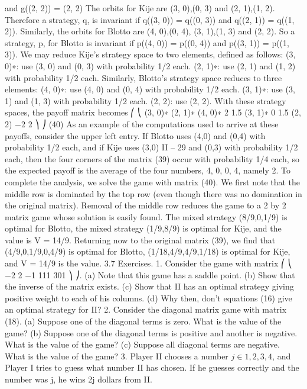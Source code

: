 \documentclass[]{report}
\begin{document}
and g((2, 2)) = (2, 2)
The orbits for Kije are {(3, 0),(0, 3)} and {(2, 1),(1, 2)}. Therefore a strategy, q, is
invariant if q((3, 0)) = q((0, 3)) and q((2, 1)) = q((1, 2)). Similarly, the orbits for Blotto
are {(4, 0),(0, 4)}, {(3, 1),(1, 3)} and {(2, 2)}. So a strategy, p, for Blotto is invariant if
p((4, 0)) = p((0, 4)) and p((3, 1)) = p((1, 3)).
We may reduce Kije’s strategy space to two elements, defined as follows:
(3, 0)∗: use (3, 0) and (0, 3) with probability 1/2 each.
(2, 1)∗: use (2, 1) and (1, 2) with probability 1/2 each.
Similarly, Blotto’s strategy space reduces to three elements:
(4, 0)∗: use (4, 0) and (0, 4) with probability 1/2 each.
(3, 1)∗: use (3, 1) and (1, 3) with probability 1/2 each.
(2, 2): use (2, 2).
With these strategy spaces, the payoff matrix becomes
⎛
⎝
(3, 0)∗ (2, 1)∗
(4, 0)∗ 2 1.5
(3, 1)∗ 0 1.5
(2, 2) −2 2
⎞
⎠ (40)
As an example of the computations used to arrive at these payoffs, consider the upper
left entry. If Blotto uses (4,0) and (0,4) with probability 1/2 each, and if Kije uses (3,0)
II – 29
and (0,3) with probability 1/2 each, then the four corners of the matrix (39) occur with
probability 1/4 each, so the expected payoff is the average of the four numbers, 4, 0, 0, 4,
namely 2.
To complete the analysis, we solve the game with matrix (40). We first note that
the middle row is dominated by the top row (even though there was no domination in the
original matrix). Removal of the middle row reduces the game to a 2 by 2 matrix game
whose solution is easily found. The mixed strategy (8/9,0,1/9) is optimal for Blotto, the
mixed strategy (1/9,8/9) is optimal for Kije, and the value is V = 14/9.
Returning now to the original matrix (39), we find that (4/9,0,1/9,0,4/9) is optimal
for Blotto, (1/18,4/9,4/9,1/18) is optimal for Kije, and V = 14/9 is the value.
3.7 Exercises.
1. Consider the game with matrix
⎛
⎝
−2 2 −1
111
301
⎞
⎠.
(a) Note that this game has a saddle point.
(b) Show that the inverse of the matrix exists.
(c) Show that II has an optimal strategy giving positive weight to each of his columns.
(d) Why then, don’t equations (16) give an optimal strategy for II?
2. Consider the diagonal matrix game with matrix (18).
(a) Suppose one of the diagonal terms is zero. What is the value of the game?
(b) Suppose one of the diagonal terms is positive and another is negative. What is
the value of the game?
(c) Suppose all diagonal terms are negative. What is the value of the game?
3. Player II chooses a number $j \in {1, 2, 3, 4}$, and Player I tries to guess what number
II has chosen. If he guesses correctly and the number was j, he wins 2j dollars from II.
\end{document}
